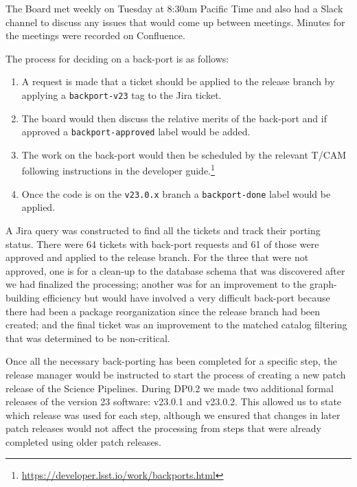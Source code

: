 The Board met weekly on Tuesday at 8:30am Pacific Time and also had a Slack channel to discuss any issues that would come up between meetings.
Minutes for the meetings were recorded on Confluence.

The process for deciding on a back-port is as follows:

\begin{enumerate}

\item A request is made that a ticket should be applied to the release branch by applying a \texttt{backport-v23} tag to the Jira ticket.
\item The board would then discuss the relative merits of the back-port and if approved a \texttt{backport-approved} label would be added.
\item The work on the back-port would then be scheduled by the relevant T/CAM following instructions in the developer guide.\footnote{\url{https://developer.lsst.io/work/backports.html}}
\item Once the code is on the \texttt{v23.0.x} branch a \texttt{backport-done} label would be applied.

\end{enumerate}

A Jira query was constructed to find all the tickets and track their porting status.
There were 64 tickets with back-port requests and 61 of those were approved and applied to the release branch.
For the three that were not approved, one is for a clean-up to the database schema that was discovered after we had finalized the processing; another was for an improvement to the graph-building efficiency but would have involved a very difficult back-port because there had been a package reorganization since the release branch had been created; and the final ticket was an improvement to the matched catalog filtering that was determined to be non-critical.

Once all the necessary back-porting has been completed for a specific step, the release manager would be instructed to start the process of creating a new patch release of the Science Pipelines.
During DP0.2 we made two additional formal releases of the version 23 software: v23.0.1 and v23.0.2.
This allowed us to state which release was used for each step, although we ensured that changes in later patch releases would not affect the processing from steps that were already completed using older patch releases.

